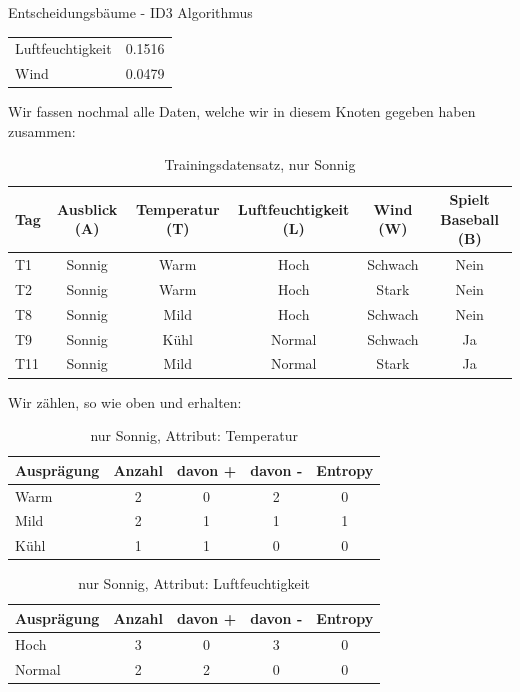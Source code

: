 \begin{task}[credit=16]{Entscheidungsbäume - ID3 Algorithmus}
\begin{subtask}[points=10,title=ID3 Algorithmus]
\begin{solution}
\begin{table}[H]
\begin{tabular}{l|c}
		Luftfeuchtigkeit & 0.1516\\
		Wind&0.0479\\
		\bottomrule
	\end{tabular}
\end{table}
Wir fassen nochmal alle Daten, welche wir in diesem Knoten gegeben haben zusammen:
\begin{table}[H]
	\centering
	\caption{Trainingsdatensatz, nur Sonnig}
	\begin{tabular}{l|c|c|c|c|c}
		\toprule
		\textbf{Tag} & \textbf{Ausblick (A)} & \textbf{Temperatur (T)}  & \textbf{Luftfeuchtigkeit (L)} & \textbf{Wind (W)}     & \textbf{Spielt Baseball (B)} \\
		\midrule
		T1  & Sonnig    & Warm        & Hoch             & Schwach  & Nein            \\
		T2  & Sonnig    & Warm        & Hoch             & Stark    & Nein            \\
		T8  & Sonnig    & Mild        & Hoch             & Schwach  & Nein            \\
		T9  & Sonnig    & Kühl        & Normal           & Schwach  & Ja              \\
		T11 & Sonnig    & Mild        & Normal           & Stark    & Ja              \\
		\bottomrule
	\end{tabular}
\end{table}
Wir zählen, so wie oben und erhalten:
\begin{table}[H]
	\centering
	\caption{nur Sonnig, Attribut: Temperatur}
	\begin{tabular}{l|c|c|c|c}
		\toprule
		\textbf{Ausprägung} & \textbf{Anzahl} & \textbf{davon +}  & \textbf{davon -} &\textbf{Entropy} \\
		\midrule
		Warm  & 2 &0&2&0      \\
		Mild & 2&1&1&1   \\
		Kühl & 1&1&0&0    \\
		\bottomrule
	\end{tabular}
\end{table}
\begin{table}[H]
	\centering
	\caption{nur Sonnig, Attribut: Luftfeuchtigkeit}
	\begin{tabular}{l|c|c|c|c}
		\toprule
		\textbf{Ausprägung} & \textbf{Anzahl} & \textbf{davon +}  & \textbf{davon -} &\textbf{Entropy} \\
		\midrule
		Hoch&3&0&3&0\\
		Normal&2&2&0&0\\

\end{tabular}
\end{table}
\end{solution}
\end{subtask}
\end{task}
